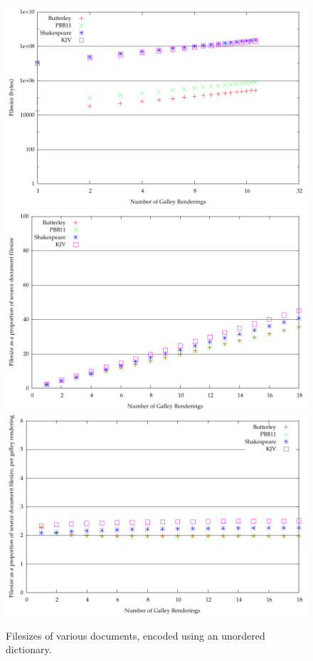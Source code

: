 \begin{figure}
  \begin{center}
  \includegraphics[width=\textwidth]{gnuplot/3-b}
  \includegraphics[width=\textwidth]{gnuplot/3-s}
  \includegraphics[width=\textwidth]{gnuplot/3-r}
  \end{center}
  \caption[Filesizes of documents with an unordered dictionary]{Filesizes of various documents, encoded using an unordered dictionary.}
  \label{fig:size-unord}
\end{figure}



